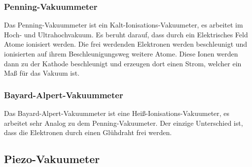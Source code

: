 		\subsubsection{Penning-Vakuummeter}

			Das Penning-Vakuummeter ist ein Kalt-Ionisations-Vakuumeter, es arbeitet im Hoch- und Ultrahochvakuum. 
			Es beruht darauf, dass durch ein Elektrisches Feld Atome ionisiert werden.
			Die frei werdenden Elektronen werden beschleunigt und ionisierten auf ihrem Beschleunigungsweg weitere Atome.
			Diese Ionen werden dann zu der Kathode beschleunigt und erzeugen dort einen Strom, welcher ein Maß für das Vakuum ist.

		\subsubsection{Bayard-Alpert-Vakuummeter}

			Das Bayard-Alpert-Vakuummeter ist eine Heiß-Ionisations-Vakuumeter, es arbeitet sehr Analog zu dem Penning-Vakuumeter.
			Der einzige Unterschied ist, dass die Elektronen durch einen Glühdraht frei werden.
		
		\subsection{Piezo-Vakuumeter}


